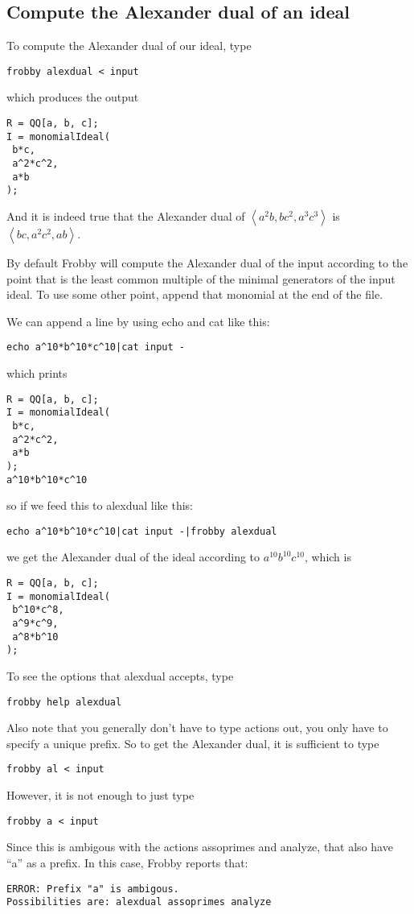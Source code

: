 \documentclass{amsart}
\theoremstyle{definition}
\newcommand{\ideal}[1]{\left<#1\right>}
\begin{document}
\subsection{Compute the Alexander dual of an ideal}

To compute the Alexander dual of our ideal, type
\begin{verbatim}
frobby alexdual < input
\end{verbatim}
which produces the output
\begin{verbatim}
R = QQ[a, b, c];
I = monomialIdeal(
 b*c,
 a^2*c^2,
 a*b
);
\end{verbatim}
And it is indeed true that the Alexander dual of
$\ideal{a^2b,bc^2,a^3c^3}$ is $\ideal{bc,a^2c^2,ab}$.

By default Frobby will compute the Alexander dual of the input
according to the point that is the least common multiple of the
minimal generators of the input ideal. To use some other point, append
that monomial at the end of the file.

We can append a line by using echo and cat like this:
\begin{verbatim}
echo a^10*b^10*c^10|cat input -
\end{verbatim}
which prints
\begin{verbatim}
R = QQ[a, b, c];
I = monomialIdeal(
 b*c,
 a^2*c^2,
 a*b
);
a^10*b^10*c^10
\end{verbatim}
so if we feed this to alexdual like this:
\begin{verbatim}
echo a^10*b^10*c^10|cat input -|frobby alexdual
\end{verbatim}
we get the Alexander dual of the ideal according to
$a^{10}b^{10}c^{10}$, which is
\begin{verbatim}
R = QQ[a, b, c];
I = monomialIdeal(
 b^10*c^8,
 a^9*c^9,
 a^8*b^10
);
\end{verbatim}

To see the options that alexdual accepts, type
\begin{verbatim}
frobby help alexdual
\end{verbatim}

Also note that you generally don't have to type actions out, you only
have to specify a unique prefix. So to get the Alexander dual, it is
sufficient to type
\begin{verbatim}
frobby al < input
\end{verbatim}
However, it is not enough to just type
\begin{verbatim}
frobby a < input
\end{verbatim}
Since this is ambigous with the actions assoprimes and analyze, that
also have ``a'' as a prefix. In this case, Frobby reports that:
\begin{verbatim}
ERROR: Prefix "a" is ambigous.
Possibilities are: alexdual assoprimes analyze
\end{verbatim}
\end{document}
